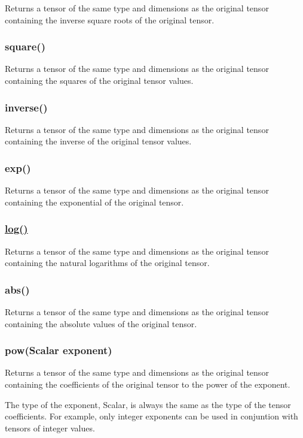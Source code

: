 Returns a tensor of the same type and dimensions as the original tensor containing the inverse square roots of the original tensor.

\subsubsection*{square()}

Returns a tensor of the same type and dimensions as the original tensor containing the squares of the original tensor values.

\subsubsection*{inverse()}

Returns a tensor of the same type and dimensions as the original tensor containing the inverse of the original tensor values.

\subsubsection*{exp()}

Returns a tensor of the same type and dimensions as the original tensor containing the exponential of the original tensor.

\subsubsection*{\hyperlink{structlog}{log()}}

Returns a tensor of the same type and dimensions as the original tensor containing the natural logarithms of the original tensor.

\subsubsection*{abs()}

Returns a tensor of the same type and dimensions as the original tensor containing the absolute values of the original tensor.

\subsubsection*{pow(\+Scalar exponent)}

Returns a tensor of the same type and dimensions as the original tensor containing the coefficients of the original tensor to the power of the exponent.

The type of the exponent, Scalar, is always the same as the type of the tensor coefficients. For example, only integer exponents can be used in conjuntion with tensors of integer values.

